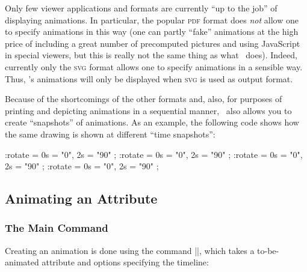 Only few viewer applications and formats are currently ``up to the job'' of
displaying animations. In particular, the popular \textsc{pdf} format does
\emph{not} allow one to specify animations in this way (one can partly ``fake''
animations at the high price of including a great number of precomputed
pictures and using JavaScript in special viewers, but this is really not the
same thing as what \pgfname\ does). Indeed, currently only the \textsc{svg}
format allows one to specify animations in a sensible way. Thus, \pgfname's
animations will only be displayed when \textsc{svg} is used as output format.

Because of the shortcomings of the other formats and, also, for purposes of
printing and depicting animations in a sequential manner, \pgfname\ also allows
you to create ``snapshots'' of animations. As an example, the following code
shows how the same drawing is shown at different ``time snapshots'':
%
\begin{codeexample}[
    width=3.9cm,
    preamble={\usetikzlibrary{animations}
\def\pgfname{\textsc{pgf}}
}]
\tikz [make snapshot of=0.5s] \scoped :rotate = { 0s = "0", 2s = "90" }
  \node [draw=blue, very thick] {\pgfname};
\tikz [make snapshot of=1s]   \scoped :rotate = { 0s = "0", 2s = "90" }
  \node [draw=blue, very thick] {\pgfname};
\tikz [make snapshot of=1.5s] \scoped :rotate = { 0s = "0", 2s = "90" }
  \node [draw=blue, very thick] {\pgfname};
\tikz [make snapshot of=2s]   \scoped :rotate = { 0s = "0", 2s = "90" }
  \node [draw=blue, very thick] {\pgfname};
\end{codeexample}


\subsection{Animating an Attribute}

\subsubsection{The Main Command}

Creating an animation is done using the command |\pgfanimateattribute|, which
takes a to-be-animated attribute and options specifying the timeline:

